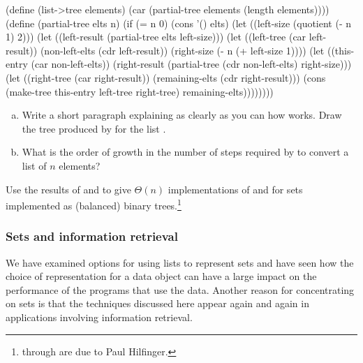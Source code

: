 \begin{exerciseGroup}
\begin{codeBlock}
(define (list->tree elements)
  (car (partial-tree elements (length elements))))
(define (partial-tree elts n)
  (if (= n 0)
      (cons '() elts)
      (let ((left-size (quotient (- n 1) 2)))
        (let ((left-result
               (partial-tree elts left-size)))
          (let ((left-tree (car left-result))
                (non-left-elts (cdr left-result))
                (right-size (- n (+ left-size 1))))
            (let ((this-entry (car non-left-elts))
                  (right-result
                   (partial-tree
                    (cdr non-left-elts)
                    right-size)))
              (let ((right-tree (car right-result))
                    (remaining-elts
                     (cdr right-result)))
                (cons (make-tree this-entry
                                 left-tree
                                 right-tree)
                      remaining-elts))))))))
\end{codeBlock}

\begin{enumerate}[a.]

\item
Write a short paragraph explaining as clearly as you can how
 works.  Draw the tree produced by  for
the list .

\item
What is the order of growth in the number of steps required by
 to convert a list of \( n \) elements?

\end{enumerate}

\label{Exercise 2.65}
 Use the results of 
and  to give \( \Theta(n) \) implementations of
 and  for sets implemented as (balanced)
binary trees.\footnote{ through  are due
to Paul Hilfinger.}
\end{exerciseGroup}

\subsubsection*{Sets and information retrieval}

We have examined options for using lists to represent sets and have seen how
the choice of representation for a data object can have a large impact on the
performance of the programs that use the data.  Another reason for
concentrating on sets is that the techniques discussed here appear again and
again in applications involving information retrieval.

